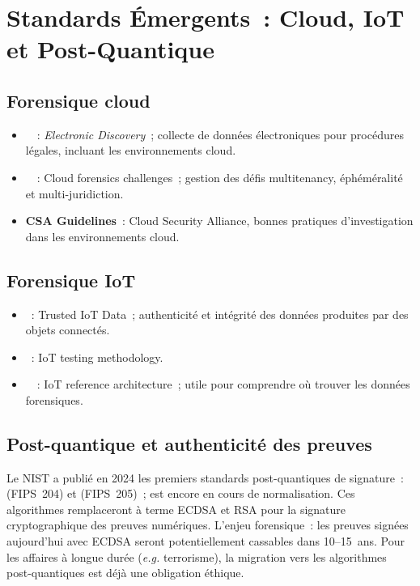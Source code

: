 \section{Standards Émergents~: Cloud, IoT et Post-Quantique}
\label{sec:standards-emergents}

\subsection{Forensique cloud}

\begin{itemize}
    \item {}~\cite{iso27050_2019}~: \textit{Electronic Discovery}~;
          collecte de données électroniques pour procédures légales,
          incluant les environnements cloud.
    \item {}~\cite{nist800210}~: Cloud forensics challenges~;
          gestion des défis multitenancy, éphéméralité et multi-juridiction.
    \item \textbf{CSA Guidelines}~: Cloud Security Alliance,
          bonnes pratiques d'investigation dans les environnements cloud.
\end{itemize}

\subsection{Forensique IoT}

\begin{itemize}
    \item {}~: Trusted IoT Data~;
          authenticité et intégrité des données produites par des objets connectés.
    \item {}~: IoT testing methodology.
    \item {}~\cite{iso30141_2018}~: IoT reference architecture~;
          utile pour comprendre où trouver les données forensiques.
\end{itemize}

\subsection{Post-quantique et authenticité des preuves}

Le NIST a publié en 2024 les premiers standards post-quantiques de
signature~:  (FIPS~204) et 
(FIPS~205)~;  est encore en cours de normalisation. Ces
algorithmes remplaceront à terme ECDSA et RSA pour la signature
cryptographique des preuves numériques. L'enjeu forensique~: les preuves
signées aujourd'hui avec ECDSA seront potentiellement cassables dans 10--15~ans.
Pour les affaires à longue durée (\textit{e.g.} terrorisme), la migration
vers les algorithmes post-quantiques est déjà une obligation éthique.

